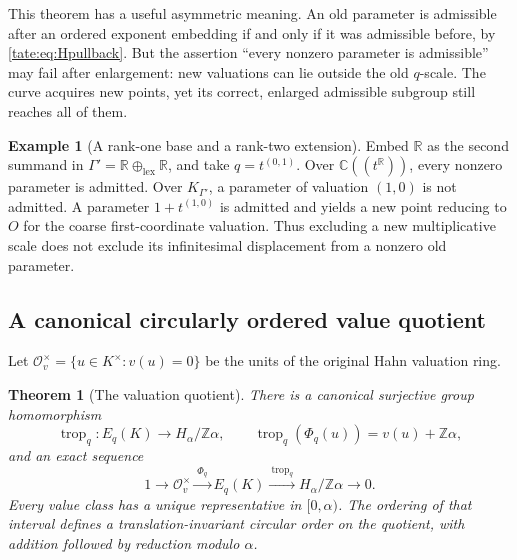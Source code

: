\documentclass[11pt,letterpaper]{article}
\newtheorem{theorem}{Theorem}[section]
\theoremstyle{definition}
\newtheorem{example}[example]{Example}
\newcommand{\C}{\mathbb C}
\newcommand{\R}{\mathbb R}
\newcommand{\Z}{\mathbb Z}
\newcommand{\trop}{\operatorname{trop}}
\newcommand{\OO}{\mathcal O}
\begin{document}
This theorem has a useful asymmetric meaning. An old parameter is admissible after an ordered exponent embedding if
and only if it was admissible before, by \eqref{tate:eq:Hpullback}.
But the assertion ``every nonzero parameter is admissible'' may fail
after enlargement: new valuations can lie outside the old $q$-scale.
The curve acquires new points, yet its correct, enlarged admissible
subgroup still reaches all of them.

\begin{example}[A rank-one base and a rank-two extension]\label{tate:ex:extension}
Embed $\R$ as the second summand in
$\Gamma'=\R\oplus_{\mathrm{lex}}\R$, and take $q=t^{(0,1)}$.
Over $\C((t^\R))$, every nonzero parameter is admitted. Over
$K_{\Gamma'}$, a parameter of valuation $(1,0)$ is not admitted.
A parameter $1+t^{(1,0)}$ is admitted and yields a new point reducing
to $O$ for the coarse first-coordinate valuation. Thus excluding a new
multiplicative scale does not exclude its infinitesimal displacement
from a nonzero old parameter.
\end{example}

\subsection{A canonical circularly ordered value quotient}

Let $\OO_v^\times=\{u\in K^\times:v(u)=0\}$ be the units of the
original Hahn valuation ring.

\begin{theorem}[The valuation quotient]\label{tate:thm:tropical}
There is a canonical surjective group homomorphism
\begin{equation}
 \trop_q:E_q(K)\longrightarrow H_\alpha/\Z\alpha,
 \qquad \trop_q(\Phi_q(u))=v(u)+\Z\alpha,\label{tate:eq:tropical}
\end{equation}
and an exact sequence
\begin{equation}
 1\longrightarrow\OO_v^\times\xrightarrow{\ \Phi_q\ }
 E_q(K)\xrightarrow{\ \trop_q\ }H_\alpha/\Z\alpha
 \longrightarrow0.\label{tate:eq:tropical-seq}
\end{equation}
Every value class has a unique representative in $[0,\alpha)$.
The ordering of that interval defines a translation-invariant circular
order on the quotient, with addition followed by reduction modulo
$\alpha$.
\end{theorem}
\end{document}
